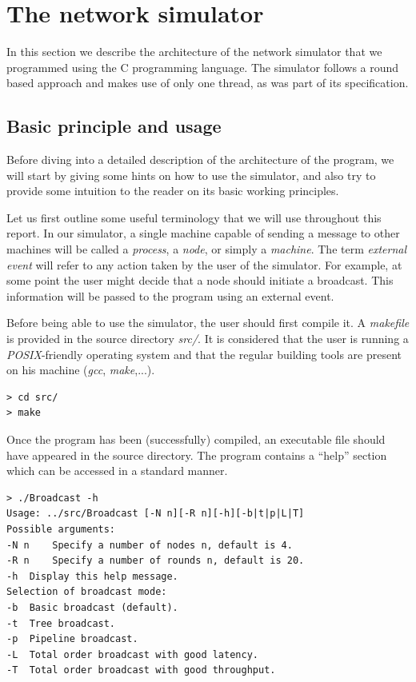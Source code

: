 \documentclass[a4paper]{article}
\begin{document}
\section{The network simulator}
In this section we describe the architecture of the network simulator that we
programmed using the C programming language. The simulator follows a round
based approach and makes use of only one thread, as was part of its
specification.

\subsection{Basic principle and usage}
Before diving into a detailed description of the architecture of the program,
we will start by giving some hints on how to use the simulator, and also try
to provide some intuition to the reader on its basic working principles.

Let us first outline some useful terminology that we will use throughout this
report. In our simulator, a single machine capable of sending a message to
other machines will be called a \textit{process}, a \textit{node}, or simply
a \textit{machine}. The term \textit{external event} will refer to any action
taken by the user of the simulator. For example, at some point the user might
decide that a node should initiate a broadcast. This information will be
passed to the program using an external event.

Before being able to use the simulator, the user should first compile it. A
\textit{makefile} is provided in the source directory \textit{src/}. It is
considered that the user is running a \textit{POSIX}-friendly operating system
and that the regular building tools are present on his machine (\textit{gcc},
\textit{make},...).
\begin{lstlisting}
> cd src/
> make
\end{lstlisting}

Once the program has been (successfully) compiled, an executable file should
have appeared in the source directory. The program contains a ``help'' section
which can be accessed in a standard manner.
\begin{lstlisting}
> ./Broadcast -h
Usage: ../src/Broadcast [-N n][-R n][-h][-b|t|p|L|T]
Possible arguments:
-N n	Specify a number of nodes n, default is 4.
-R n	Specify a number of rounds n, default is 20.
-h	Display this help message.
Selection of broadcast mode:
-b	Basic broadcast (default).
-t	Tree broadcast.
-p	Pipeline broadcast.
-L	Total order broadcast with good latency.
-T	Total order broadcast with good throughput.
\end{lstlisting}
\end{document}
